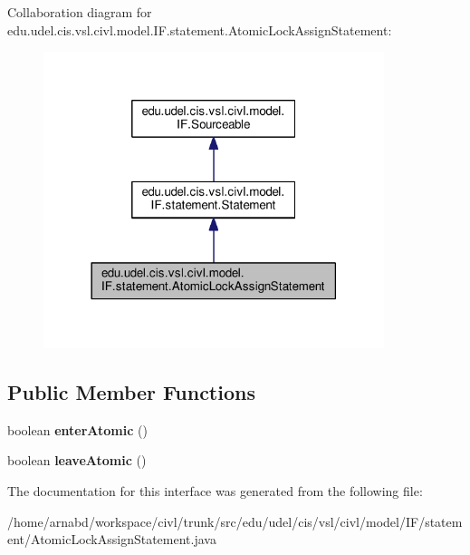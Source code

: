 Collaboration diagram for edu.\+udel.\+cis.\+vsl.\+civl.\+model.\+I\+F.\+statement.\+Atomic\+Lock\+Assign\+Statement\+:
\nopagebreak
\begin{figure}[H]
\begin{center}
\leavevmode
\includegraphics[width=282pt]{interfaceedu_1_1udel_1_1cis_1_1vsl_1_1civl_1_1model_1_1IF_1_1statement_1_1AtomicLockAssignStatement__coll__graph}
\end{center}
\end{figure}
\subsection*{Public Member Functions}
\begin{DoxyCompactItemize}
\item 
\hypertarget{interfaceedu_1_1udel_1_1cis_1_1vsl_1_1civl_1_1model_1_1IF_1_1statement_1_1AtomicLockAssignStatement_a53049f8b5450dc8d866e782a80100e4b}{}boolean {\bfseries enter\+Atomic} ()\label{interfaceedu_1_1udel_1_1cis_1_1vsl_1_1civl_1_1model_1_1IF_1_1statement_1_1AtomicLockAssignStatement_a53049f8b5450dc8d866e782a80100e4b}

\item 
\hypertarget{interfaceedu_1_1udel_1_1cis_1_1vsl_1_1civl_1_1model_1_1IF_1_1statement_1_1AtomicLockAssignStatement_a663f3bfb68767049cad1fc1319cb9545}{}boolean {\bfseries leave\+Atomic} ()\label{interfaceedu_1_1udel_1_1cis_1_1vsl_1_1civl_1_1model_1_1IF_1_1statement_1_1AtomicLockAssignStatement_a663f3bfb68767049cad1fc1319cb9545}

\end{DoxyCompactItemize}


The documentation for this interface was generated from the following file\+:\begin{DoxyCompactItemize}
\item 
/home/arnabd/workspace/civl/trunk/src/edu/udel/cis/vsl/civl/model/\+I\+F/statement/Atomic\+Lock\+Assign\+Statement.\+java\end{DoxyCompactItemize}
